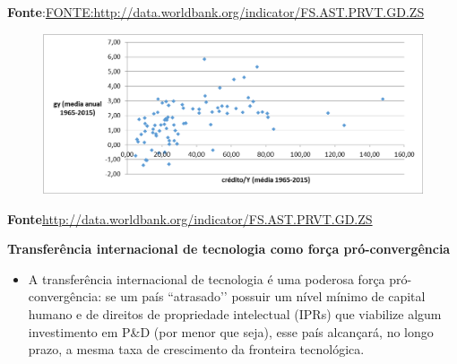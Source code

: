 \documentclass[a4paper,12pt]{article}[abntex2]
\begin{document}
\textbf{Fonte}:\url{FONTE:http://data.worldbank.org/indicator/FS.AST.PRVT.GD.ZS}

\begin{figure}[H]
    \centering
    \includegraphics[width=0.7\linewidth]{Imagens/a20i2.png}
\end{figure}

\textbf{Fonte}\url{http://data.worldbank.org/indicator/FS.AST.PRVT.GD.ZS}


\textbf{Transferência internacional de tecnologia como força pró-convergência}

\begin{itemize}
    \item A transferência internacional de tecnologia é uma poderosa força pró-convergência: se um país ``atrasado’’ possuir um nível mínimo de capital humano e de direitos de propriedade intelectual (IPRs) que viabilize algum investimento em P\&D (por menor que seja), esse país alcançará, no longo prazo, a mesma taxa de crescimento da fronteira tecnológica.
\end{itemize}
\end{document}
